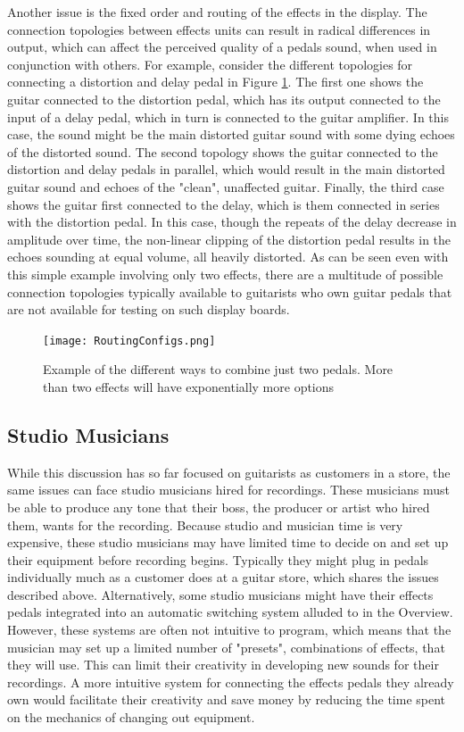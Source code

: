 \documentclass{article}
\begin{document}
	Another issue is the fixed order and routing of the effects in the display.  The connection topologies between effects units can result in radical differences in output, which can affect the perceived quality of a pedals sound, when used in conjunction with others.  For example, consider the different topologies for connecting a distortion and delay pedal in Figure \ref{fig:PedalConnectionTopologies}.  The first one shows the guitar connected to the distortion pedal, which has its output connected to the input of a delay pedal, which in turn is connected to the guitar amplifier.  In this case, the sound might be the main distorted guitar sound with some dying echoes of the distorted sound.  The second topology shows the guitar connected to the distortion and delay pedals in parallel, which would result in the main distorted guitar sound and echoes of the "clean", unaffected guitar.  Finally, the third case shows the guitar first connected to the delay, which is them connected in series with the distortion pedal.  In this case, though the repeats of the delay decrease in amplitude over time, the non-linear clipping of the distortion pedal results in the echoes sounding at equal volume, all heavily distorted.  As can be seen even with this simple example involving only two effects, there are a multitude of possible connection topologies typically available to guitarists who own guitar pedals that are not available for testing on such display boards.

	\begin{figure}
		\centering
		\texttt{[image: RoutingConfigs.png]}
		\caption{Example of the different ways to combine just two pedals.  More than two effects will have exponentially more options}
		\label{fig:PedalConnectionTopologies}
	\end{figure}

	\subsection{Studio Musicians}

	While this discussion has so far focused on guitarists as customers in a store, the same issues can face studio musicians hired for recordings.  These musicians must be able to produce any tone that their boss, the producer or artist who hired them, wants for the recording.  Because studio and musician time is very expensive, these studio musicians may have limited time to decide on and set up their equipment before recording begins.  Typically they might plug in pedals individually much as a customer does at a guitar store, which shares the issues described above.  Alternatively, some studio musicians might have their effects pedals integrated into an automatic switching system alluded to in the Overview.  However, these systems are often not intuitive to program, which means that the musician may set up a limited number of "presets", combinations of effects, that they will use.  This can limit their creativity in developing new sounds for their recordings.  A more intuitive system for connecting the effects pedals they already own would facilitate their creativity and save money by reducing the time spent on the mechanics of changing out equipment.
	\color{black}
\end{document}
